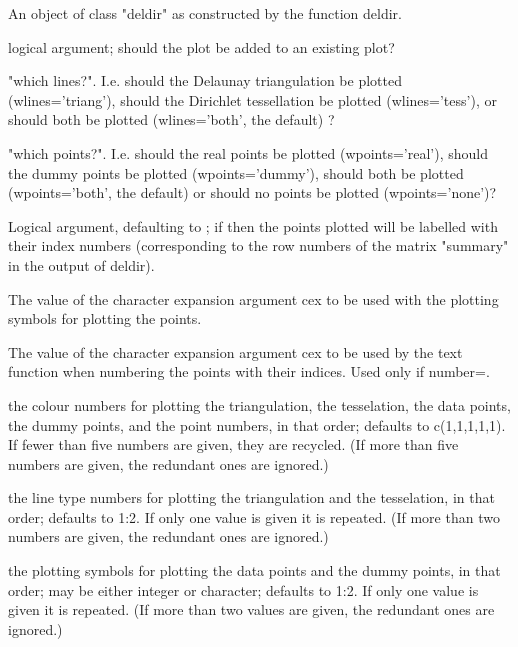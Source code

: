 \begin{Arguments}
\begin{ldescription}
\item[\code{x}] An object of class "deldir" as constructed by the function deldir.

\item[\code{add}] logical argument; should the plot be added to an existing plot?

\item[\code{wlines}] "which lines?".  I.e.  should the Delaunay triangulation be plotted
(wlines='triang'), should the Dirichlet tessellation be plotted
(wlines='tess'), or should both be plotted (wlines='both', the
default) ?

\item[\code{wpoints}] "which points?".  I.e.  should the real points be plotted
(wpoints='real'), should the dummy points be plotted
(wpoints='dummy'), should both be plotted (wpoints='both', the
default) or should no points be plotted (wpoints='none')?

\item[\code{number}] Logical argument, defaulting to ; if  then the
points plotted will be labelled with their index numbers
(corresponding to the row numbers of the matrix "summary" in the
output of deldir).

\item[\code{cex}] The value of the character expansion argument cex to be used
with the plotting symbols for plotting the points.

\item[\code{nex}] The value of the character expansion argument cex to be used by the
text function when numbering the points with their indices.  Used only
if number=.

\item[\code{col}] the colour numbers for plotting the triangulation, the tesselation,
the data points, the dummy points, and the point numbers, in that
order; defaults to c(1,1,1,1,1).  If fewer than five numbers are
given, they are recycled.  (If more than five numbers are given, the
redundant ones are ignored.)

\item[\code{lty}] the line type numbers for plotting the triangulation and the
tesselation, in that order; defaults to 1:2.  If only one value is
given it is repeated.  (If more than two numbers are given, the
redundant ones are ignored.)

\item[\code{pch}] the plotting symbols for plotting the data points and the dummy
points, in that order; may be either integer or character; defaults
to 1:2.  If only one value is given it is repeated.  (If more than
two values are given, the redundant ones are ignored.)


\end{ldescription}
\end{Arguments}
